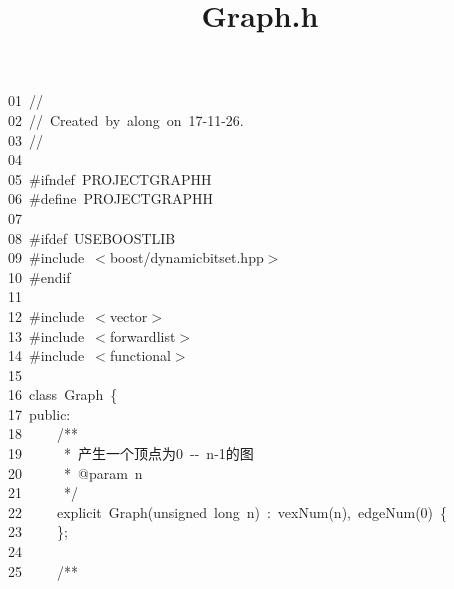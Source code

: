 \documentclass{ctexart}
\title{Graph.h}
\newcommand{\hlstd}[1]{\textcolor[rgb]{0.2,0.2,0.2}{#1}}
\newcommand{\hlnum}[1]{\textcolor[rgb]{0.06,0.58,0.63}{#1}}
\newcommand{\hlslc}[1]{\textcolor[rgb]{0.59,0.59,0.59}{#1}}
\newcommand{\hlcom}[1]{\textcolor[rgb]{0.59,0.59,0.59}{#1}}
\newcommand{\hlppc}[1]{\textcolor[rgb]{0.41,0.78,0.23}{#1}}
\newcommand{\hlopt}[1]{\textcolor[rgb]{0.2,0.2,0.2}{#1}}
\newcommand{\hllin}[1]{\textcolor[rgb]{0.59,0.59,0.59}{#1}}
\newcommand{\hlkwb}[1]{\textcolor[rgb]{0.63,0,0.31}{#1}}
\newcommand{\hlkwc}[1]{\textcolor[rgb]{0,0.63,0.31}{#1}}
\newcommand{\hlkwd}[1]{\textcolor[rgb]{0.78,0.23,0.41}{#1}}
\begin{document}
\pagecolor{bgcolor}
\noindent
\ttfamily
\hlstd{}\hllin{01\ }\hlstd{}\hlslc{//}\\
\hllin{02\ }\hlstd{}\hlslc{//\ Created\ by\ along\ on\ 17{-}11{-}26.}\\
\hllin{03\ }\hlstd{}\hlslc{//}\\
\hllin{04\ }\hlstd{}\\
\hllin{05\ }\hlstd{}\hlppc{\#ifndef\ PROJECT\textunderscore GRAPH\textunderscore H}\\
\hllin{06\ }\hlstd{}\hlppc{\#define\ PROJECT\textunderscore GRAPH\textunderscore H}\\
\hllin{07\ }\hlstd{}\\
\hllin{08\ }\hlstd{}\hlppc{\#ifdef\ USE\textunderscore BOOST\textunderscore LIB}\\
\hllin{09\ }\hlstd{}\hlppc{\#include\ $<$boost/dynamic\textunderscore bitset.hpp$>$}\\
\hllin{10\ }\hlstd{}\hlppc{\#endif}\\
\hllin{11\ }\hlstd{}\\
\hllin{12\ }\hlstd{}\hlppc{\#include\ $<$vector$>$}\\
\hllin{13\ }\hlstd{}\hlppc{\#include\ $<$forward\textunderscore list$>$}\\
\hllin{14\ }\hlstd{}\hlppc{\#include\ $<$functional$>$}\\
\hllin{15\ }\hlstd{}\\
\hllin{16\ }\hlstd{}\hlkwc{class\ }\hlstd{Graph\ }\hlopt{\{}\\
\hllin{17\ }\hlstd{}\hlkwc{public}\hlstd{}\hlopt{:}\\
\hllin{18\ }\hlstd{}\hlstd{\ \ \ \ }\hlstd{}\hlcom{/{*}{*}}\\
\hllin{19\ }\hlcom{}\hlstd{\ \ \ \ \ }\hlcom{{*}\ 产生一个顶点为0\ {-}{-}\ n{-}1的图}\\
\hllin{20\ }\hlcom{}\hlstd{\ \ \ \ \ }\hlcom{{*}\ @param\ n}\\
\hllin{21\ }\hlcom{}\hlstd{\ \ \ \ \ }\hlcom{{*}/}\hlstd{}\\
\hllin{22\ }\hlstd{}\hlstd{\ \ \ \ }\hlstd{}\hlkwc{explicit\ }\hlstd{}\hlkwd{Graph}\hlstd{}\hlopt{(}\hlstd{}\hlkwb{unsigned\ long\ }\hlstd{n}\hlopt{)\ :\ }\hlstd{}\hlkwd{vexNum}\hlstd{}\hlopt{(}\hlstd{n}\hlopt{),\ }\hlstd{}\hlkwd{edgeNum}\hlstd{}\hlopt{(}\hlstd{}\hlnum{0}\hlstd{}\hlopt{)\ \{}\Righttorque\\
\hllin{23\ }\hlstd{}\hlstd{\ \ \ \ }\hlstd{}\hlopt{\};}\\
\hllin{24\ }\hlstd{}\\
\hllin{25\ }\hlstd{}\hlstd{\ \ \ \ }\hlstd{}\hlcom{/{*}{*}}\\
\end{document}
